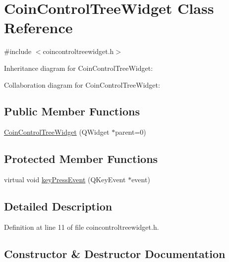 \hypertarget{class_coin_control_tree_widget}{}\section{Coin\+Control\+Tree\+Widget Class Reference}
\label{class_coin_control_tree_widget}


{\ttfamily \#include $<$coincontroltreewidget.\+h$>$}



Inheritance diagram for Coin\+Control\+Tree\+Widget\+:


Collaboration diagram for Coin\+Control\+Tree\+Widget\+:
\subsection*{Public Member Functions}
\begin{DoxyCompactItemize}
\item 
\hyperlink{class_coin_control_tree_widget_a426fcbff6c4a6707d50148b281b2dc3f}{Coin\+Control\+Tree\+Widget} (Q\+Widget $\ast$parent=0)
\end{DoxyCompactItemize}
\subsection*{Protected Member Functions}
\begin{DoxyCompactItemize}
\item 
virtual void \hyperlink{class_coin_control_tree_widget_a214c041952383bd6b8cb38fbccdd5c8c}{key\+Press\+Event} (Q\+Key\+Event $\ast$event)
\end{DoxyCompactItemize}


\subsection{Detailed Description}


Definition at line 11 of file coincontroltreewidget.\+h.



\subsection{Constructor \& Destructor Documentation}
\hypertarget{class_coin_control_tree_widget_a426fcbff6c4a6707d50148b281b2dc3f}{}
